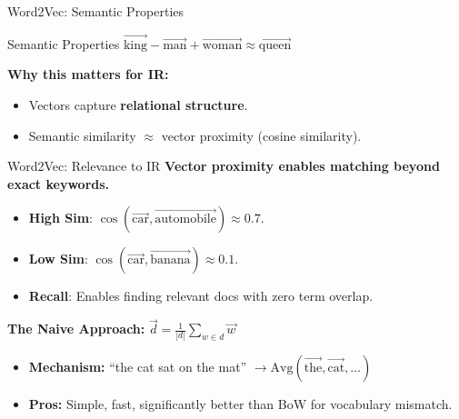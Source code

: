 \documentclass[aspectratio=169]{beamer}
\newif\ifanimated
\newcommand{\cpause}{\ifanimated\pause\fi}
\begin{document}
\begin{frame}{Word2Vec: Semantic Properties}
\begin{alertblock}{Semantic Properties}
$\vec{\text{king}} - \vec{\text{man}} + \vec{\text{woman}} \approx \vec{\text{queen}}$
\end{alertblock}

\vspace{1em}
\cpause
\textbf{Why this matters for IR:}
\begin{itemize}
    \item Vectors capture \textbf{relational structure}.
    \item Semantic similarity $\approx$ vector proximity (cosine similarity).
\end{itemize}
\end{frame}


\begin{frame}{Word2Vec: Relevance to IR}
\textbf{Vector proximity enables matching beyond exact keywords.}

\vspace{0.8em}
\begin{itemize}
    \item \textbf{High Sim}: $\cos(\vec{\text{car}}, \vec{\text{automobile}}) \approx 0.7$.
    \item \textbf{Low Sim}: $\cos(\vec{\text{car}}, \vec{\text{banana}}) \approx 0.1$.
    \item \textbf{Recall}: Enables finding relevant docs with zero term overlap.
\end{itemize}

\vspace{1em}
\cpause

\textbf{The Naive Approach:} $\vec{d} = \frac{1}{|d|}\sum_{w \in d} \vec{w}$

\vspace{1em}
\cpause
\begin{itemize}
    \item \textbf{Mechanism:} ``the cat sat on the mat'' $\to \text{Avg}(\vec{\text{the}}, \vec{\text{cat}}, \ldots)$
    \item \textbf{Pros:} Simple, fast, significantly better than BoW for vocabulary mismatch.
\end{itemize}

\end{frame}
\end{document}
